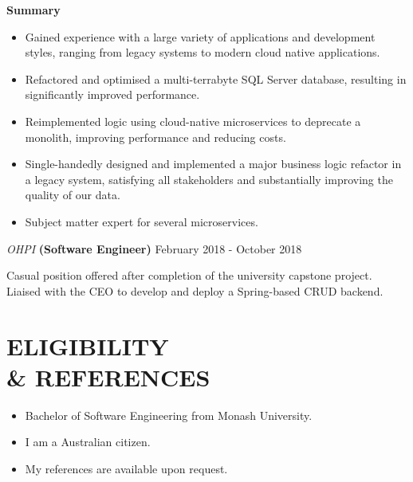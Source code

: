 \documentclass[margin, 11pt]{style}
\begin{document}
\begin{resume}
\textbf{Summary}
\begin{itemize}
\item Gained experience with a large variety of applications and development styles, ranging from legacy systems to modern cloud native applications.
\item Refactored and optimised a multi-terrabyte SQL Server database, resulting in significantly improved performance.
\item Reimplemented logic using cloud-native microservices to deprecate a monolith, improving performance and reducing costs.
\item Single-handedly designed and implemented a major business logic refactor in a legacy system, satisfying all stakeholders and substantially improving the quality of our data.
\item Subject matter expert for several microservices.
\end{itemize}

\vspace{15pt}
{\sl OHPI} \textbf{(Software Engineer)} \hfill February 2018 - October 2018

Casual position offered after completion of the university capstone project. Liaised with the CEO to develop and deploy a Spring-based CRUD backend.

\section{ELIGIBILITY \\ \& REFERENCES}

\begin{itemize}
\item Bachelor of Software Engineering from Monash University.
\item I am a Australian citizen.
\item My references are available upon request.
\end{itemize}

\end{resume}
\end{document}
